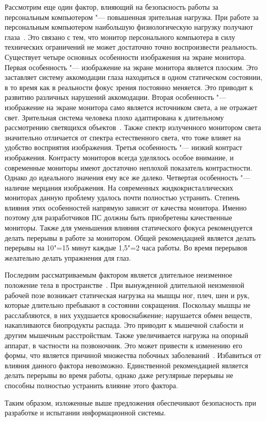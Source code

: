 Рассмотрим еще один фактор, влияющий на безопасность работы за персональным компьютером "--- повышенная зрительная нагрузка.
При работе за персональным компьютером наибольшую физиологическую нагрузку получают глаза~\cite{ot_eyes}.
Это связано с тем, что монитор персонального компьютера в силу технических ограничений не может достаточно точно воспроизвести реальность.
Существует четыре основных особенности изображения на экране монитора.
Первая особенность "--- изображение на экране монитора является плоским. Это заставляет систему аккомодации глаза находиться в одном статическом состоянии, в то время как в реальности фокус зрения постоянно меняется. Это приводит к развитию различных нарушений аккомодации.
Вторая особенность "--- изображение на экране монитора само является источником света, а не отражает свет. Зрительная система человека плохо адаптирована к длительному рассмотрению светящихся объектов~\cite{ot_long_work_pc}. Также спектр излученного монитором света значительно отличается от спектра естественного света, что тоже влияет на удобство восприятия изображения.
Третья особенность "--- низкий контраст изображения. Контрасту мониторов всегда уделялось особое внимание, и современные мониторы имеют достаточно неплохой показатель контрастности. Однако до идеального значения ему все же далеко.
Четвертая особенность "--- наличие мерцания изображения. На современных жидкокристаллических мониторах данную проблему удалось почти полностью устранить.
Степень влияния этих особенностей напрямую зависит от качества монитора. Именно поэтому для разработчиков ПС должны быть приобретены качественные мониторы.
Также для уменьшения влияния статического фокуса рекомендуется делать перерывы в работе за монитором.
Общей рекомендацией является делать перерывы на 10"=15 минут каждые 1,5"=2 часа работы.
Во время перерывов желательно делать упражнения для глаз.

Последним рассматриваемым фактором является длительное неизменное положение тела в пространстве~\cite{ot_sit}.
При вынужденной длительной неизменной рабочей позе возникает статическая нагрузка на мышцы ног, плеч, шеи и рук, которые длительно пребывают в состоянии сокращения.
Поскольку мышцы не расслабляются, в них ухудшается кровоснабжение; нарушается обмен веществ, накапливаются биопродукты распада.
Это приводит к мышечной слабости и другим мышечным расстройствам.
Также увеличивается нагрузка на опорный аппарат, в частности на позвоночник. Это может привести к изменению его формы, что является причиной множества побочных заболеваний~\cite{ot_back_diseases}.
Избавиться от влияния данного фактора невозможно.
Единственной рекомендацией является делать перерывы во время работы, однако даже регулярные перерывы не способны полностью устранить влияние этого фактора.

Таким образом, изложенные выше предложения обеспечивают безопасность при разработке и испытании информационной системы.
